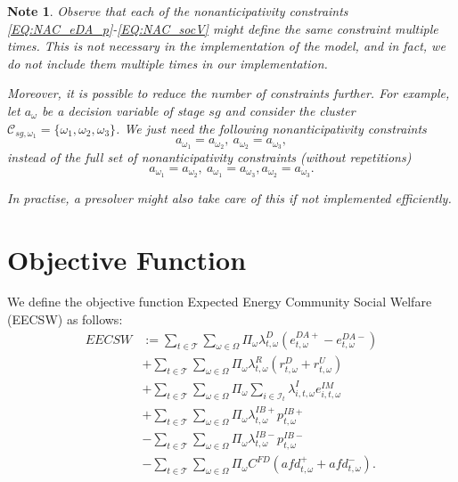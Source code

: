 \documentclass{article}
\newtheorem{note}{Note}[section]
\begin{document}
\begin{note}
Observe that each of the nonanticipativity constraints \eqref{EQ:NAC_eDA_p}-\eqref{EQ:NAC_socV} might define the same constraint multiple times. This is not necessary in the implementation of the model, and in fact, we do not include them multiple times in our implementation.
	
Moreover, it is possible to reduce the number of constraints further. For example, let $a_{\omega}$ be a decision variable of stage $sg$ and consider the cluster $\mathcal{C}_{sg, \omega_1} = \{ \omega_1, \omega_2, \omega_3 \}$. We just need the following nonanticipativity constraints 
$$
a_{\omega_1} = a_{\omega_2}, \ a_{\omega_2} = a_{\omega_3},
$$
instead of the full set of nonanticipativity constraints (without repetitions)
$$
a_{\omega_1} = a_{\omega_2}, \ a_{\omega_1} = a_{\omega_3}, a_{\omega_2} = a_{\omega_3}.
$$

In practise, a presolver might also take care of this if not implemented efficiently.	
\end{note}


\section{Objective Function}
\label{SEC:ObjectiveFunction}

We define the objective function Expected Energy Community Social Welfare (EECSW) as follows:
\begin{subequations}
	\begin{align}
		EECSW & := \sum_{t \in \mathcal{T}} \sum_{\omega \in \Omega} \Pi_{\omega} \lambda^D_{t, \omega} (e^{DA+}_{t, \omega} - e^{DA-}_{t, \omega}) \label{EQ:DAincome} \\
		& + \sum_{t \in \mathcal{T}} \sum_{\omega \in \Omega} \Pi_{\omega} \lambda^R_{t, \omega} (r^D_{t, \omega} + r^U_{t, \omega}) \label{EQ:RESincome} \\
		& + \sum_{t \in \mathcal{T}} \sum_{\omega \in \Omega} \Pi_{\omega} \sum_{i \in \mathcal{I}_t} \lambda^{I}_{i, t, \omega} e^{IM}_{i, t, \omega} \label{EQ:IMincome} \\
		& + \sum_{t \in \mathcal{T}} \sum_{\omega \in \Omega} \Pi_{\omega} \lambda^{IB+}_{t, \omega} p^{IB+}_{t, \omega} \label{EQ:PosIBcollectRights} \\
		& - \sum_{t \in \mathcal{T}} \sum_{\omega \in \Omega} \Pi_{\omega} \lambda^{IB-}_{t, \omega} p^{IB-}_{t, \omega} \label{EQ:NegIBPayObligations} \\
		& - \sum_{t \in \mathcal{T}} \sum_{\omega \in \Omega} \Pi_{\omega} C^{FD} (afd^+_{t, \omega} + afd^-_{t, \omega}). \label{EQ:DemFlexPenalty}
	\end{align}
	\label{EQ:EECSW}
\end{subequations}
\end{document}
